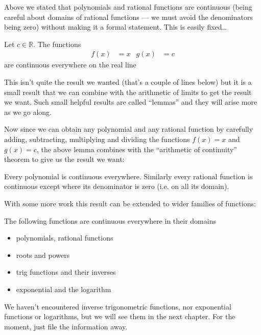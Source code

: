 Above we stated that polynomials and rational functions are
continuous (being careful about domains of rational functions ---
we must avoid the denominators being zero) without making it a formal
statement. This is easily fixed\dots

\begin{lemma}
 Let $c \in \mathbb{R}$. The functions
  \begin{align*}
  f(x) &= x & g(x) &= c
  \end{align*}
  are continuous everywhere on the real line
\end{lemma}
This isn't quite the result we wanted (that's a couple of lines below) but it
is a small result that we can combine with the arithmetic of limits to get the
result we want. Such small helpful results are called ``lemmas'' and they will
arise more as we go along.

Now since we can obtain any polynomial and any rational function by carefully
adding, subtracting, multiplying and dividing the functions $f(x)=x$ and
$g(x)=c$, the above lemma combines with the ``arithmetic of continuity''
theorem to give us the result we want:
%
\begin{theorem}
Every polynomial is continuous everywhere. Similarly every rational
function is continuous except where its denominator is zero (i.e. on all its
domain).
\end{theorem}

With some more work this result can be extended to wider families of functions:
\begin{theorem}
The following functions are continuous everywhere in their domains
\begin{itemize}
\item polynomials, rational functions
\item roots and powers
\item trig functions and their inverses
\item exponential and the logarithm
\end{itemize}
\end{theorem}
We haven't encountered inverse trigonometric functions, nor exponential
functions or logarithms, but we will see them in the next chapter. For the
moment, just file the information away.


